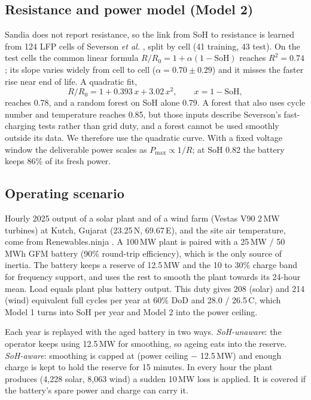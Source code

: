 \documentclass[conference]{IEEEtran}
\begin{document}
\subsection{Resistance and power model (Model 2)}
Sandia does not report resistance, so the link from SoH to resistance is learned from 124 LFP cells of Severson \emph{et al.} \cite{severson2019}, split by cell (41 training, 43 test). On the test cells the common linear formula $R/R_0 = 1 + \alpha(1-\mathrm{SoH})$ reaches $R^2 = 0.74$; its slope varies widely from cell to cell ($\alpha = 0.70 \pm 0.29$) and it misses the faster rise near end of life. A quadratic fit,
\begin{equation}
R/R_0 = 1 + 0.393\,x + 3.02\,x^2, \qquad x = 1 - \mathrm{SoH},
\end{equation}
reaches 0.78, and a random forest on SoH alone 0.79. A forest that also uses cycle number and temperature reaches 0.85, but those inputs describe Severson's fast-charging tests rather than grid duty, and a forest cannot be used smoothly outside its data. We therefore use the quadratic curve. With a fixed voltage window the deliverable power scales as $P_{\max} \propto 1/R$; at SoH 0.82 the battery keeps 86\% of its fresh power.

\subsection{Operating scenario}
Hourly 2025 output of a solar plant and of a wind farm (Vestas V90 2\,MW turbines) at Kutch, Gujarat (23.25\,N, 69.67\,E), and the site air temperature, come from Renewables.ninja \cite{staffell2016}. A 100\,MW plant is paired with a 25\,MW / 50\,MWh GFM battery (90\% round-trip efficiency), which is the only source of inertia. The battery keeps a reserve of 12.5\,MW and the 10 to 30\% charge band for frequency support, and uses the rest to smooth the plant towards its 24-hour mean. Load equals plant plus battery output. This duty gives 208 (solar) and 214 (wind) equivalent full cycles per year at 60\% DoD and 28.0 / 26.5\,\textdegree C, which Model 1 turns into SoH per year and Model 2 into the power ceiling.

Each year is replayed with the aged battery in two ways. \emph{SoH-unaware}: the operator keeps using 12.5\,MW for smoothing, so ageing eats into the reserve. \emph{SoH-aware}: smoothing is capped at (power ceiling $-$ 12.5\,MW) and enough charge is kept to hold the reserve for 15 minutes. In every hour the plant produces (4,228 solar, 8,063 wind) a sudden 10\,MW loss is applied. It is covered if the battery's spare power and charge can carry it.
\end{document}
